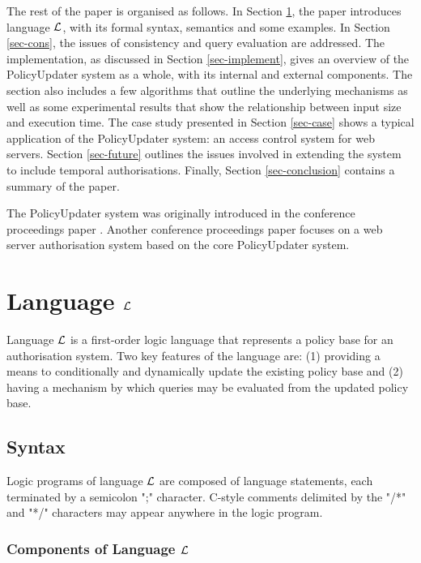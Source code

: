 \documentclass[glov2,twocolumn,final]{svjour2}
\begin{document}
    The rest of the paper is organised as follows. In Section \ref{sec-langl},
    the paper introduces language ${\cal L}$, with its formal syntax, semantics
    and some examples. In Section \ref{sec-cons}, the issues of consistency and
    query evaluation are addressed. The implementation, as discussed in Section
    \ref{sec-implement}, gives an overview of the PolicyUpdater system as
    a whole, with its internal and external components. The section also
    includes a few algorithms that outline the underlying mechanisms as well as
    some experimental results that show the relationship between input size
    and execution time. The case study presented in Section \ref{sec-case}
    shows a typical application of the PolicyUpdater system: an access control
    system for web servers. Section \ref{sec-future} outlines the issues
    involved in extending the system to include temporal authorisations.
    Finally, Section \ref{sec-conclusion} contains a summary of the paper.

    The PolicyUpdater system was originally introduced in the conference
    proceedings paper \cite{CR1}. Another conference proceedings paper
    \cite{CR2} focuses on a web server authorisation system based on the
    core PolicyUpdater system.

  \section{Language $\cal{L}$}
    \label{sec-langl}

    Language $\cal{L}$ is a first-order logic language that represents a policy
    base for an authorisation system. Two key features of the language are: (1)
    providing a means to conditionally and dynamically update the existing
    policy base and (2) having a mechanism by which queries may be evaluated
    from the updated policy base.

    \subsection{Syntax}
      \label{subsec-syntax}

      Logic programs of language ${\cal L}$ are composed of language
      statements, each terminated by a semicolon ";" character. C-style
      comments delimited by the "/*" and "*/" characters may appear anywhere in
      the logic program.

      \subsubsection{Components of Language $\cal{L}$}
\end{document}
